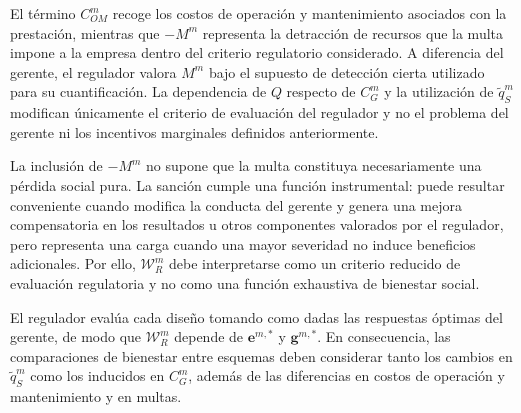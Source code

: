 El término \(C_{OM}^m\) recoge los costos de operación y mantenimiento asociados con la prestación, mientras que \(-M^m\) representa la detracción de recursos que la multa impone a la empresa dentro del criterio regulatorio considerado. A diferencia del gerente, el regulador valora \(M^m\) bajo el supuesto de detección cierta utilizado para su cuantificación. La dependencia de \(Q\) respecto de \(C_G^m\) y la utilización de \(\widetilde q_S^m\) modifican únicamente el criterio de evaluación del regulador y no el problema del gerente ni los incentivos marginales definidos anteriormente.

La inclusión de \(-M^m\) no supone que la multa constituya necesariamente una pérdida social pura. La sanción cumple una función instrumental: puede resultar conveniente cuando modifica la conducta del gerente y genera una mejora compensatoria en los resultados u otros componentes valorados por el regulador, pero representa una carga cuando una mayor severidad no induce beneficios adicionales. Por ello, \(\mathcal W_R^m\) debe interpretarse como un criterio reducido de evaluación regulatoria y no como una función exhaustiva de bienestar social.

El regulador evalúa cada diseño tomando como dadas las respuestas óptimas del gerente, de modo que \(\mathcal W_R^m\) depende de \(\mathbf e^{m,*}\) y \(\mathbf g^{m,*}\). En consecuencia, las comparaciones de bienestar entre esquemas deben considerar tanto los cambios en \(\widetilde q_S^m\) como los inducidos en \(C_G^m\), además de las diferencias en costos de operación y mantenimiento y en multas.

